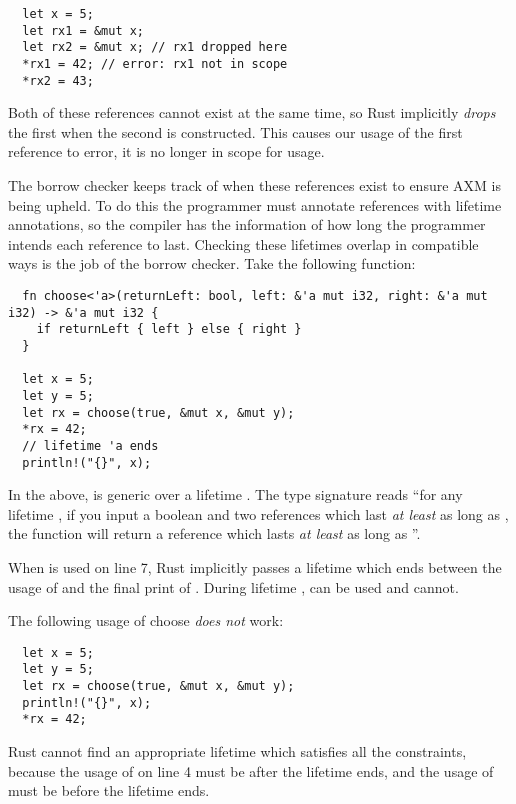 \documentclass[12pt,twoside]{report}
\begin{document}
\begin{verbatim}
  let x = 5;
  let rx1 = &mut x;
  let rx2 = &mut x; // rx1 dropped here
  *rx1 = 42; // error: rx1 not in scope
  *rx2 = 43;
\end{verbatim}

Both of these references cannot exist at the same time, so Rust implicitly \textit{drops} the first when the second is constructed. This causes our usage of the first reference to error, it is no longer in scope for usage.

The borrow checker keeps track of when these references exist to ensure AXM is being upheld. To do this the programmer must annotate references with lifetime annotations, so the compiler has the information of how long the programmer intends each reference to last. Checking these lifetimes overlap in compatible ways is the job of the borrow checker. Take the following function:

\begin{verbatim}
  fn choose<'a>(returnLeft: bool, left: &'a mut i32, right: &'a mut i32) -> &'a mut i32 {
    if returnLeft { left } else { right }
  }

  let x = 5;
  let y = 5;
  let rx = choose(true, &mut x, &mut y);
  *rx = 42;
  // lifetime 'a ends
  println!("{}", x);
\end{verbatim}

In the above,  is generic over a lifetime . The type signature reads ``for any lifetime , if you input a boolean and two references which last \textit{at least} as long as , the function will return a reference which lasts \textit{at least} as long as ''.

When  is used on line 7, Rust implicitly passes a lifetime which ends between the usage of  and the final print of . During lifetime ,  can be used and  cannot.

The following usage of choose \textit{does not} work:

\begin{verbatim}
  let x = 5;
  let y = 5;
  let rx = choose(true, &mut x, &mut y);
  println!("{}", x);
  *rx = 42;
\end{verbatim}

Rust cannot find an appropriate lifetime which satisfies all the constraints, because the usage of  on line 4 must be after the lifetime ends, and the usage of  must be before the lifetime ends.
\end{document}
